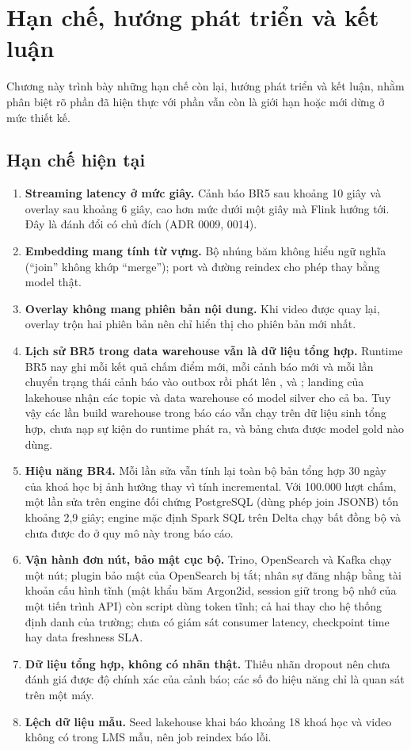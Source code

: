 \chapter{Hạn chế, hướng phát triển và kết luận}
\label{chap:limits}

Chương này trình bày những hạn chế còn lại, hướng phát triển và kết luận, nhằm phân biệt rõ phần đã hiện thực với phần vẫn còn là giới hạn hoặc mới dừng ở mức thiết kế.

\section{Hạn chế hiện tại}

\begin{enumerate}
  \item \textbf{Streaming latency ở mức giây.} Cảnh báo BR5 sau khoảng 10 giây và overlay sau khoảng 6 giây, cao hơn mức dưới một giây mà Flink hướng tới. Đây là đánh đổi có chủ đích (ADR 0009, 0014).
  \item \textbf{Embedding mang tính từ vựng.} Bộ nhúng băm không hiểu ngữ nghĩa (``join'' không khớp ``merge''); port  và đường reindex cho phép thay bằng model thật.
  \item \textbf{Overlay không mang phiên bản nội dung.} Khi video được quay lại, overlay trộn hai phiên bản nên chỉ hiển thị cho phiên bản mới nhất.
  \item \textbf{Lịch sử BR5 trong data warehouse vẫn là dữ liệu tổng hợp.} Runtime BR5 nay ghi mỗi kết quả chấm điểm mới, mỗi cảnh báo mới và mỗi lần chuyển trạng thái cảnh báo vào outbox  rồi phát lên ,  và ; landing của lakehouse nhận các topic  và data warehouse có model silver cho cả ba. Tuy vậy các lần build warehouse trong báo cáo vẫn chạy trên dữ liệu sinh tổng hợp, chưa nạp sự kiện do runtime phát ra, và bảng  chưa được model gold nào dùng.
  \item \textbf{Hiệu năng BR4.} Mỗi lần sửa vẫn tính lại toàn bộ bản tổng hợp 30 ngày của khoá học bị ảnh hưởng thay vì tính incremental. Với 100.000 lượt chấm, một lần sửa trên engine đối chứng PostgreSQL (dùng phép join JSONB) tốn khoảng 2,9 giây; engine mặc định Spark SQL trên Delta chạy bất đồng bộ và chưa được đo ở quy mô này trong báo cáo.
  \item \textbf{Vận hành đơn nút, bảo mật cục bộ.} Trino, OpenSearch và Kafka chạy một nút; plugin bảo mật của OpenSearch bị tắt; nhân sự đăng nhập bằng tài khoản cấu hình tĩnh (mật khẩu băm Argon2id, session giữ trong bộ nhớ của một tiến trình API) còn script dùng token tĩnh; cả hai thay cho hệ thống định danh của trường; chưa có giám sát consumer latency, checkpoint time hay data freshness SLA.
  \item \textbf{Dữ liệu tổng hợp, không có nhãn thật.} Thiếu nhãn dropout nên chưa đánh giá được độ chính xác của cảnh báo; các số đo hiệu năng chỉ là quan sát trên một máy.
  \item \textbf{Lệch dữ liệu mẫu.} Seed lakehouse khai báo khoảng 18 khoá học và video không có trong LMS mẫu, nên job reindex báo lỗi.
\end{enumerate}


